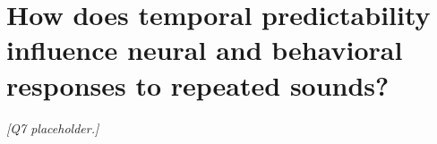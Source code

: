 \section{How does temporal predictability influence neural and behavioral responses to repeated sounds?}
\label{sec:q7}


\textit{[Q7 placeholder.]}
